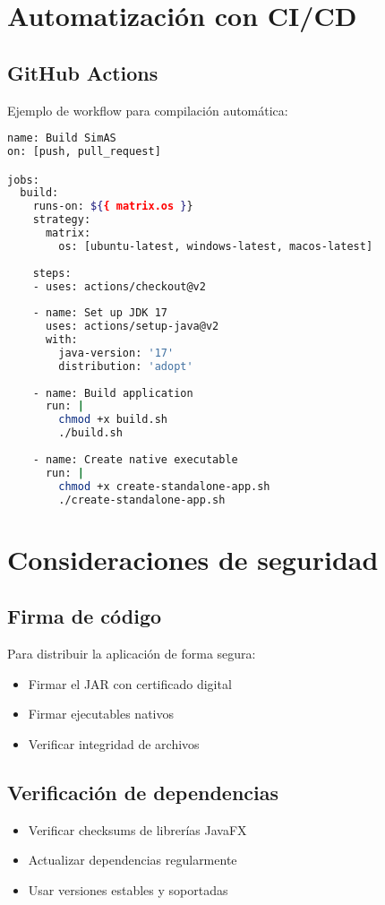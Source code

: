 \section{Automatización con CI/CD}

\subsection{GitHub Actions}

Ejemplo de workflow para compilación automática:

\begin{lstlisting}[language=bash, caption=Workflow de GitHub Actions]
name: Build SimAS
on: [push, pull_request]

jobs:
  build:
    runs-on: ${{ matrix.os }}
    strategy:
      matrix:
        os: [ubuntu-latest, windows-latest, macos-latest]
    
    steps:
    - uses: actions/checkout@v2
    
    - name: Set up JDK 17
      uses: actions/setup-java@v2
      with:
        java-version: '17'
        distribution: 'adopt'
    
    - name: Build application
      run: |
        chmod +x build.sh
        ./build.sh
    
    - name: Create native executable
      run: |
        chmod +x create-standalone-app.sh
        ./create-standalone-app.sh
\end{lstlisting}

\section{Consideraciones de seguridad}

\subsection{Firma de código}

Para distribuir la aplicación de forma segura:

\begin{itemize}
    \item Firmar el JAR con certificado digital
    \item Firmar ejecutables nativos
    \item Verificar integridad de archivos
\end{itemize}

\subsection{Verificación de dependencias}

\begin{itemize}
    \item Verificar checksums de librerías JavaFX
    \item Actualizar dependencias regularmente
    \item Usar versiones estables y soportadas
\end{itemize}
